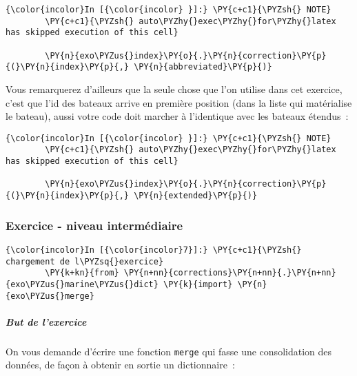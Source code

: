     \begin{Verbatim}[commandchars=\\\{\},frame=single,framerule=0.3mm,rulecolor=\color{cellframecolor}]
{\color{incolor}In [{\color{incolor} }]:} \PY{c+c1}{\PYZsh{} NOTE}
        \PY{c+c1}{\PYZsh{} auto\PYZhy{}exec\PYZhy{}for\PYZhy{}latex has skipped execution of this cell}
        
        \PY{n}{exo\PYZus{}index}\PY{o}{.}\PY{n}{correction}\PY{p}{(}\PY{n}{index}\PY{p}{,} \PY{n}{abbreviated}\PY{p}{)}
\end{Verbatim}


    Vous remarquerez d'ailleurs que la seule chose que l'on utilise dans cet
exercice, c'est que l'id des bateaux arrive en première position (dans
la liste qui matérialise le bateau), aussi votre code doit marcher à
l'identique avec les bateaux étendus~:

    \begin{Verbatim}[commandchars=\\\{\},frame=single,framerule=0.3mm,rulecolor=\color{cellframecolor}]
{\color{incolor}In [{\color{incolor} }]:} \PY{c+c1}{\PYZsh{} NOTE}
        \PY{c+c1}{\PYZsh{} auto\PYZhy{}exec\PYZhy{}for\PYZhy{}latex has skipped execution of this cell}
        
        \PY{n}{exo\PYZus{}index}\PY{o}{.}\PY{n}{correction}\PY{p}{(}\PY{n}{index}\PY{p}{,} \PY{n}{extended}\PY{p}{)}
\end{Verbatim}


    \hypertarget{exercice---niveau-intermuxe9diaire}{%
\subsubsection{Exercice - niveau
intermédiaire}\label{exercice---niveau-intermuxe9diaire}}

    \begin{Verbatim}[commandchars=\\\{\},frame=single,framerule=0.3mm,rulecolor=\color{cellframecolor}]
{\color{incolor}In [{\color{incolor}7}]:} \PY{c+c1}{\PYZsh{} chargement de l\PYZsq{}exercice}
        \PY{k+kn}{from} \PY{n+nn}{corrections}\PY{n+nn}{.}\PY{n+nn}{exo\PYZus{}marine\PYZus{}dict} \PY{k}{import} \PY{n}{exo\PYZus{}merge}
\end{Verbatim}


    \hypertarget{but-de-lexercice}{%
\subparagraph{But de l'exercice}\label{but-de-lexercice}}

    On vous demande d'écrire une fonction \texttt{merge} qui fasse une
consolidation des données, de façon à obtenir en sortie un
dictionnaire~:

